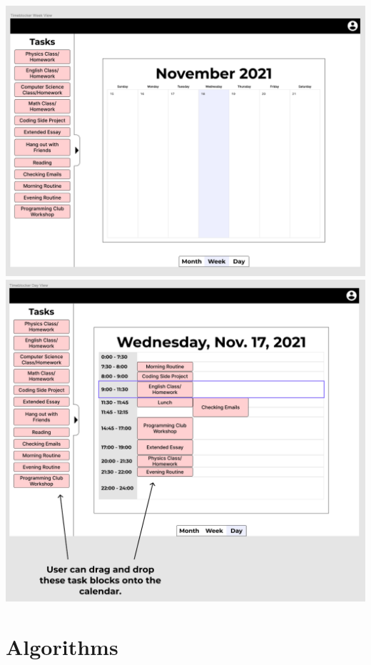 \documentclass[12pt]{report}
\begin{document}
\includegraphics[width=\textwidth]{week-view.png}
\includegraphics[width=\textwidth]{day-view.png}

\section*{Algorithms}
\end{document}
